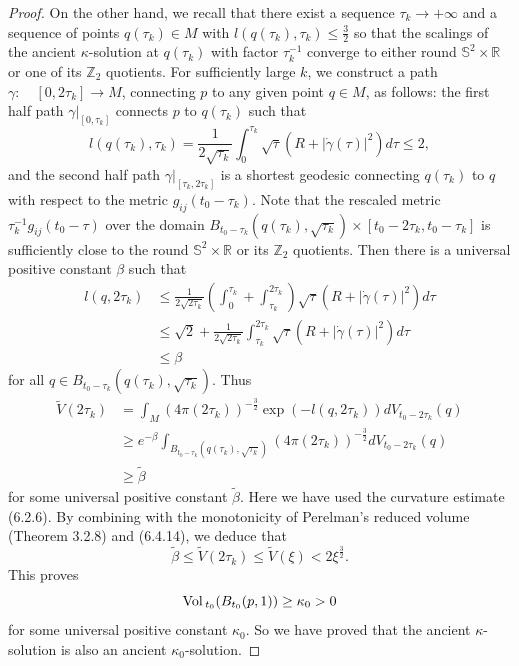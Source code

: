 \begin{proof}
On the other hand, we recall that there exist a sequence
$\tau_k\rightarrow+\infty$ and a sequence of points $q(\tau_k)\in
M$ with $l(q(\tau_k),\tau_k)\le\frac{3}{2}$ so that the scalings
of the ancient $\kappa$-solution at $q(\tau_k)$ with factor
$\tau_k^{-1}$ converge to either round $\mathbb{S}^2\times
\mathbb{R}$ or one of its $\mathbb{Z}_2$ quotients. For
sufficiently large $k$, we construct a path
$\gamma:\quad[0,2\tau_k]\rightarrow M$, connecting $p$ to any
given point $q\in M$, as follows: the first half path
$\gamma|_{[0,\tau_k]}$ connects $p$ to $q(\tau_k)$ such that
$$
l(q(\tau_k),\tau_k)
=\frac{1}{2\sqrt{\tau_k}}\int_0^{\tau_k}\sqrt{\tau}
(R+|\dot{\gamma}(\tau)|^2)d\tau\le2,
$$
and the second half path $\gamma|_{[\tau_k,2\tau_k]}$ is a
shortest geodesic connecting $q(\tau_k)$ to $q$ with respect to
the metric $g_{ij}(t_0-\tau_k)$. Note that the rescaled metric
$\tau_k^{-1}g_{ij}(t_0-\tau)$ over the domain
$B_{t_0-\tau_k}(q(\tau_k),\sqrt{\tau_k})\times[t_0-2\tau_k,t_0-\tau_k]$
is sufficiently close to the round $\mathbb{S}^2\times \mathbb{R}$
or its $\mathbb{Z}_2$ quotients. Then there is a universal
positive constant $\beta$ such that
\begin{align*}
l(q,2\tau_k)& \le \frac{1}{2\sqrt{2\tau_k}}\left(\int_0^{\tau_k}
+\int_{\tau_k}^{2\tau_k}\right)\sqrt{\tau}
(R+|\dot{\gamma}(\tau)|^2)d\tau\\
&  \le \sqrt{2}+\frac{1}{2\sqrt{2\tau_k}}
\int_{\tau_k}^{2\tau_k}\sqrt{\tau}(R+|\dot{\gamma}(\tau)|^2)d\tau\\
&  \le \beta
\end{align*}
for all $q\in B_{t_0-\tau_k}(q(\tau_k),\sqrt{\tau_k})$. Thus
\begin{align*}
\widetilde{V}(2\tau_k)&  = \int_M (4\pi(2\tau_k))^{-\frac{3}{2}}
\exp(-l(q,2\tau_k))dV_{t_0-2\tau_k}(q)\\
&  \ge e^{-\beta}\int_{B_{t_0-\tau_k}(q(\tau_k),
\sqrt{\tau_k})}(4\pi(2\tau_k))^{-\frac{3}{2}}dV_{t_0-2\tau_k}(q)\\
&  \ge \tilde{\beta}
\end{align*}
for some universal positive constant $\tilde{\beta}$. Here we have
used the curvature estimate (6.2.6). By combining with the
monotonicity of Perelman's reduced volume (Theorem 3.2.8) and
(6.4.14), we deduce that
$$
\tilde{\beta}\le\widetilde{V}(2\tau_k)
\le\widetilde{V}(\xi)<2\xi^\frac{3}{2}.
$$
This proves
$$
{\rm Vol}\,_{t_0}(B_{t_0}(p,1))\ge \kappa_0>0
$$
for some universal positive constant $\kappa_0$. So we have proved
that the ancient $\kappa$-solution is also an ancient
$\kappa_0$-solution.
\end{proof}

